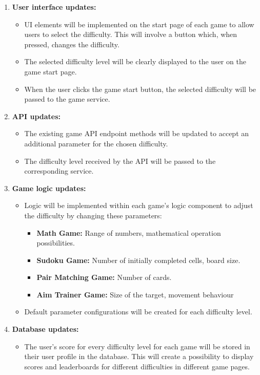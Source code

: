\documentclass[11pt,a4paper]{article}
\begin{document}
\begin{enumerate}
    \item \textbf{User interface updates:}
    \begin{itemize}
        \item UI elements will be implemented on the start page of each game to allow users to select the difficulty. This will involve a button which, when pressed, changes the difficulty.
    	\item The selected difficulty level will be clearly displayed to the user on the game start page.
    	\item When the user clicks the game start button, the selected difficulty will be passed to the game service.
    \end{itemize}
    \item \textbf{API updates:}
    \begin{itemize}
        \item The existing game API endpoint methods will be updated to accept an additional parameter for the chosen difficulty.
    	\item The difficulty level received by the API will be passed to the corresponding service.
    \end{itemize}
    \item \textbf{Game logic updates:}
    \begin{itemize}
        \item Logic will be implemented within each game's logic component to adjust the difficulty by changing these parameters:
    			\begin{itemize}
    				\item \textbf{Math Game:} Range of numbers, mathematical operation possibilities.
    				\item \textbf{Sudoku Game:} Number of initially completed cells, board size.
    				\item \textbf{Pair Matching Game:} Number of cards.
    				\item \textbf{Aim Trainer Game:} Size of the target, movement behaviour
    			\end{itemize}
    		\item Default parameter configurations will be created for each difficulty level.
    	 
    \end{itemize}
    \item \textbf{Database updates:}
    \begin{itemize}
        \item The user's score for every difficulty level for each game will be stored in their user profile in the database. This will create a possibility to display scores and leaderboards for different difficulties in different game pages. 
    \end{itemize}
\end{enumerate}
\end{document}
